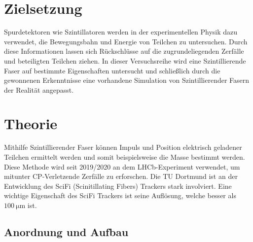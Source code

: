 \section{Zielsetzung}
\label{sec:Zielsetzung}

Spurdetektoren wie Szintillatoren werden in der experimentellen Physik dazu verwendet, die Bewegungsbahn und Energie
von Teilchen zu untersuchen. Durch diese Informationen lassen sich Rückschlüsse auf die zugrundeliegenden Zerfälle und
beteiligten Teilchen ziehen. In dieser Versuchsreihe wird eine Szintillierende Faser auf bestimmte Eigenschaften
untersucht und schließlich durch die gewonnenen Erkenntnisse eine vorhandene Simulation von Szintillierender Fasern
der Realität angepasst.

\section{Theorie}
\label{sec:Theorie}

Mithilfe Szintillierender Faser können Impuls und Position elektrisch geladener Teilchen ermittelt werden
und somit beispielsweise die Masse bestimmt werden. Diese Methode wird seit 2019/2020 an dem LHCb-Experiment 
verwendet, um mitunter CP-Verletzende Zerfälle zu erforschen. Die TU Dortmund ist an der Entwicklung 
des SciFi (Scinitillating Fibers) Trackers stark involviert. Eine wichtige Eigenschaft des SciFi Trackers ist 
seine Auflösung, welche besser als $\qty{100}{\micro\metre}$\cite{SciFi_Versuch} ist.

\subsection{Anordnung und Aufbau}

